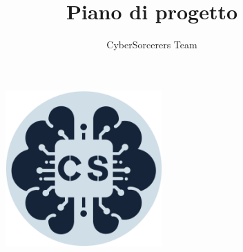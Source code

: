 \documentclass{article}
\title{\Huge{\textbf{Piano di progetto}}\vspace{-1em}}
\author{CyberSorcerers Team}
\date{}
\begin{document}
\maketitle
\vspace{-3em}
\begin{figure}[h]
  \centering
  \includegraphics[width=6cm, height=6cm]{documenti/logo rotondo.png}
  \label{fig:immagine}
\end{figure}
\end{document}
